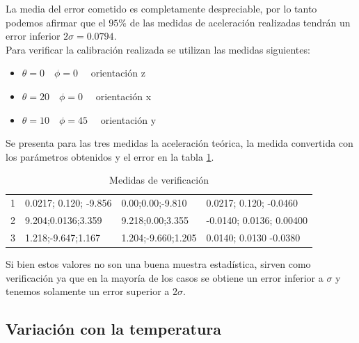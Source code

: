 \documentclass[main]{subfiles}
\begin{document}
La media del error cometido es completamente despreciable, por lo tanto podemos afirmar que el $95\% $ de las medidas de aceleración realizadas tendrán un error inferior $2\sigma=0.0794$.\\
 
Para verificar la calibración realizada se utilizan las medidas siguientes:
\begin{itemize}
\item $\theta = 0 \quad \phi = 0 \quad$ orientación z
\item $\theta = 20 \quad \phi = 0 \quad$ orientación x
\item $\theta = 10 \quad \phi = 45 \quad$ orientación y
\end{itemize}

Se presenta para las tres medidas la aceleración teórica, la medida convertida con los parámetros obtenidos y el error en la tabla \ref{tab:diff}. 

\begin{table}[H]
\centering
\begin{tabular}{|p{90pt}|p{90pt}|p{90pt}|p{90pt}|}
\hline
\cellcolor[gray]{0.8}{Medida} & \cellcolor[gray]{0.8}{Aceleración Medida ($ms^{-2}$)}&\cellcolor[gray]{0.8}{Aceleración teórica($m^{-2}$)}& \cellcolor[gray]{0.8}{Error($ms^{-2}$)} \\
\hline
1 &  0.0217; 0.120; -9.856   & 0.00;0.00;-9.810     & 0.0217; 0.120; -0.0460\\
\hline
2 & 9.204;0.0136;3.359       & 9.218;0.00;3.355     & -0.0140; 0.0136; 0.00400\\
\hline
3 & 1.218;-9.647;1.167       & 1.204;-9.660;1.205   & 0.0140; 0.0130 -0.0380\\
\hline
\end{tabular}
\caption{Medidas de verificación}
\label{tab:diff}
\end{table}

Si bien estos valores no son una buena muestra estadística, sirven como verificación ya que en la mayoría de los casos se obtiene un error inferior a $\sigma$ y tenemos solamente un error superior a $2\sigma$.

\subsection{Variación con la temperatura}
\end{document}

